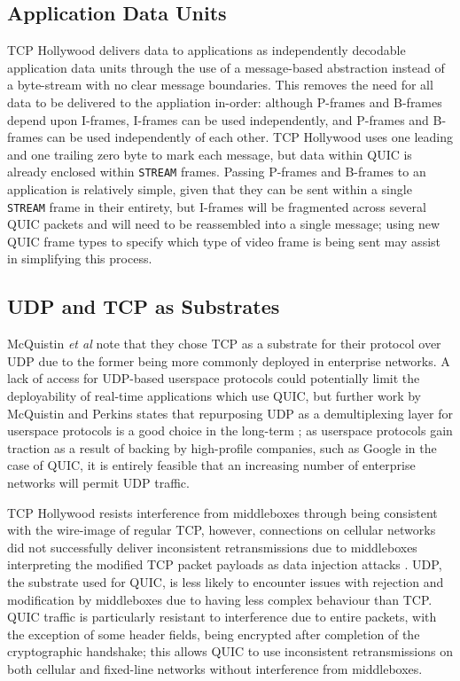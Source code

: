 \documentclass{mprop}
\begin{document}
\subsection{Application Data Units}

TCP Hollywood delivers data to applications as independently decodable application data units through the use of a message-based abstraction instead of a byte-stream with no clear message boundaries. This removes the need for all data to be delivered to the appliation in-order: although P-frames and B-frames depend upon I-frames, I-frames can be used independently, and P-frames and B-frames can be used independently of each other. TCP Hollywood uses one leading and one trailing zero byte to mark each message, but data within QUIC is already enclosed within \texttt{STREAM} frames. Passing P-frames and B-frames to an application is relatively simple, given that they can be sent within a single \texttt{STREAM} frame in their entirety, but I-frames will be fragmented across several QUIC packets and will need to be reassembled into a single message; using new QUIC frame types to specify which type of video frame is being sent may assist in simplifying this process.

\subsection{UDP and TCP as Substrates}

McQuistin \textit{et al} note that they chose TCP as a substrate for their protocol over UDP due to the former being more commonly deployed in enterprise networks. A lack of access for UDP-based userspace protocols could potentially limit the deployability of real-time applications which use QUIC, but further work by McQuistin and Perkins states that repurposing UDP as a demultiplexing layer for userspace protocols is a good choice in the long-term \cite{McQuistin2016Ossification}; as userspace protocols gain traction as a result of backing by high-profile companies, such as Google in the case of QUIC, it is entirely feasible that an increasing number of enterprise networks will permit UDP traffic.

TCP Hollywood resists interference from middleboxes through being consistent with the wire-image of regular TCP, however, connections on cellular networks did not successfully deliver inconsistent retransmissions due to middleboxes interpreting the modified TCP packet payloads as data injection attacks \cite{McQuistin2016Ossification}. UDP, the substrate used for QUIC, is less likely to encounter issues with rejection and modification by middleboxes due to having less complex behaviour than TCP. QUIC traffic is particularly resistant to interference due to entire packets, with the exception of some header fields, being encrypted after completion of the cryptographic handshake; this allows QUIC to use inconsistent retransmissions on both cellular and fixed-line networks without interference from middleboxes.
\end{document}
